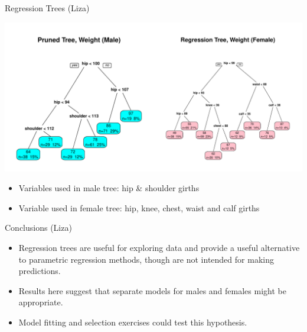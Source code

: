 \documentclass[table]{beamer}\usepackage[]{graphicx}\usepackage[]{color}
\makeatletter
\def\maxwidth{ %
  \ifdim\Gin@nat@width>\linewidth
    \linewidth
  \else
    \Gin@nat@width
  \fi
}
\newenvironment{knitrout}{}{} %
\makeatother
\begin{document}

\begin{frame}{Regression Trees (Liza)}




\begin{knitrout}
\color{fgcolor}
\includegraphics[width=\maxwidth]{figure/mf_plots} 

\end{knitrout}


\begin{itemize}
  \item Variables used in male tree: hip & shoulder girths
  \item Variable used in female tree: hip, knee, chest, waist and calf girths
\end{itemize}

\end{frame}


\begin{frame}{Conclusions (Liza)}

\begin{itemize}
    \item Regression trees are useful for exploring data and provide a useful alternative to parametric regression methods, though are not intended for making predictions.
  \item Results here suggest that separate models for males and females might be appropriate.
  \item Model fitting and selection exercises could test this hypothesis.
\end{itemize}

\end{frame}
\end{document}
